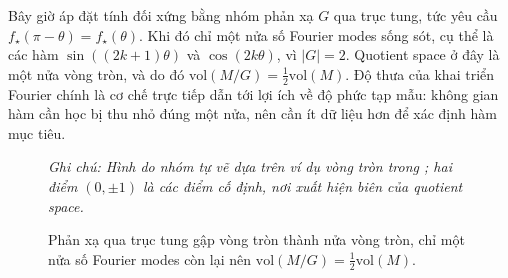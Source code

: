 Bây giờ áp đặt tính đối xứng bằng nhóm phản xạ $G$ qua trục tung, tức yêu cầu $f_{\star}(\pi - \theta) = f_{\star}(\theta)$. Khi đó chỉ một nửa số Fourier modes sống sót, cụ thể là các hàm $\sin((2k+1)\theta)$ và $\cos(2k\theta)$, vì $|G| = 2$. Quotient space ở đây là một nửa vòng tròn, và do đó $\mathrm{vol}(M/G) = \tfrac{1}{2}\mathrm{vol}(M)$. Độ thưa của khai triển Fourier chính là cơ chế trực tiếp dẫn tới lợi ích về độ phức tạp mẫu: không gian hàm cần học bị thu nhỏ đúng một nửa, nên cần ít dữ liệu hơn để xác định hàm mục tiêu.
 
\begin{figure}[H]
    \centering
    \caption{Phản xạ qua trục tung gập vòng tròn thành nửa vòng tròn, chỉ một nửa số Fourier modes còn lại nên $\mathrm{vol}(M/G) = \tfrac{1}{2}\mathrm{vol}(M)$.}
    \label{fig:circle-reflection}
    \vspace{2mm}

    \textit{Ghi chú: Hình do nhóm tự vẽ dựa trên ví dụ vòng tròn trong \cite{tahmasebi2023exact}; hai điểm $(0, \pm 1)$ là các điểm cố định, nơi xuất hiện biên của quotient space.}
\end{figure}
 
